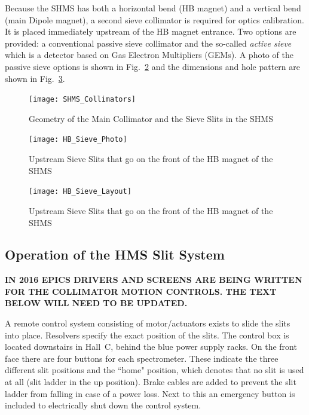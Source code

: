 {Because the SHMS has both a horizontal bend (HB magnet) and a vertical bend (main Dipole
magnet), a second sieve collimator is required for optics calibration. It is placed immediately
upstream of the HB magnet entrance. Two options are provided: a conventional passive
sieve collimator and the so-called \textit{active sieve} which is a detector based on Gas Electron 
Multipliers (GEMs).  A photo of the passive sieve options is shown in Fig.~\ref{fig:HB_Sieve_Photo}
and the dimensions and hole pattern are shown in Fig.~\ref{fig:HB_Sieve_Layout}.

\begin{figure}
\begin{center}
\texttt{[image: SHMS\_Collimators]}
\caption{Geometry of the Main Collimator and the Sieve Slits in the SHMS \label{fig:SHMS_Collimators}}
\end{center}
\end{figure}

\begin{figure}
\texttt{[image: HB\_Sieve\_Photo]}
\caption{Upstream Sieve Slits that go on the front of the HB magnet of the SHMS \label{fig:HB_Sieve_Photo}}
\end{figure}

\begin{figure}
\texttt{[image: HB\_Sieve\_Layout]}
\caption{Upstream Sieve Slits that go on the front of the HB magnet of the SHMS \label{fig:HB_Sieve_Layout}}
\end{figure}

\subsection{Operation of the HMS Slit System}\label{sssec:slit_control}

{\bf IN 2016 EPICS DRIVERS AND SCREENS ARE BEING WRITTEN FOR 
THE COLLIMATOR MOTION CONTROLS. THE TEXT BELOW WILL NEED TO BE UPDATED.}

A remote control system consisting of motor/actuators exists to slide
the slits into place. Resolvers specify the exact position of the
slits.  The control box is located downstairs in Hall~C, behind the
blue power supply racks. On the front face there are four buttons for
each spectrometer. These indicate the three different slit positions
and the ``home" position, which denotes that no slit is used at all
(slit ladder in the up position).  Brake cables are added to prevent
the slit ladder from falling in case of a power loss. Next to this an
emergency button is included to electrically shut down the control
system.

}
